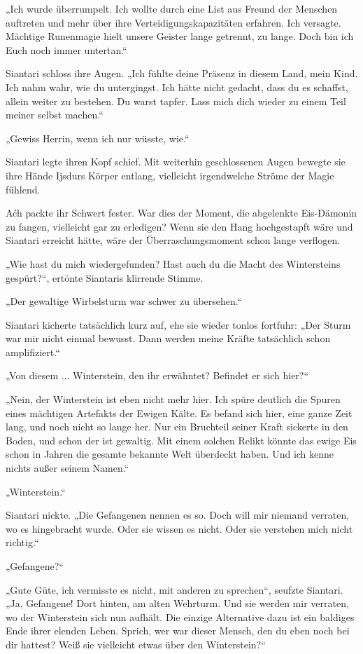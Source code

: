 „Ich wurde überrumpelt. Ich wollte durch eine List aus Freund der Menschen auftreten und mehr über ihre Verteidigungskapazitäten erfahren. Ich versagte. Mächtige Runenmagie hielt unsere Geister lange getrennt, zu lange. Doch bin ich Euch noch immer untertan.“

Siantari schloss ihre Augen. „Ich fühlte deine Präsenz in diesem Land, mein Kind. Ich nahm wahr, wie du untergingst. Ich hätte nicht gedacht, dass du es schaffst, allein weiter zu bestehen. Du warst tapfer. Lass mich dich wieder zu einem Teil meiner selbst machen.“

„Gewiss Herrin, wenn ich nur wüsste, wie.“

Siantari legte ihren Kopf schief. Mit weiterhin geschlossenen Augen bewegte sie ihre Hände Ijsdurs Körper entlang, vielleicht irgendwelche Ströme der Magie fühlend.

Aćh packte ihr Schwert fester. War dies der Moment, die abgelenkte Eis-Dämonin zu fangen, vielleicht gar zu erledigen? Wenn sie den Hang hochgestapft wäre und Siantari erreicht hätte, wäre der Überraschungsmoment schon lange verflogen.

„Wie hast du mich wiedergefunden? Hast auch du die Macht des Wintersteins gespürt?“, ertönte Siantaris klirrende Stimme.

„Der gewaltige Wirbelsturm war schwer zu übersehen.“

Siantari kicherte tatsächlich kurz auf, ehe sie wieder tonlos fortfuhr: „Der Sturm war mir nicht einmal bewusst. Dann werden meine Kräfte tatsächlich schon amplifiziert.“

„Von diesem ... Winterstein, den ihr erwähntet? Befindet er sich hier?“

„Nein, der Winterstein ist eben nicht mehr hier. Ich spüre deutlich die Spuren eines mächtigen Artefakts der Ewigen Kälte. Es befand sich hier, eine ganze Zeit lang, und noch nicht so lange her. Nur ein Bruchteil seiner Kraft sickerte in den Boden, und schon der ist gewaltig. Mit einem solchen Relikt könnte das ewige Eis schon in Jahren die gesamte bekannte Welt überdeckt haben. Und ich kenne nichts außer seinem Namen.“

„Winterstein.“

Siantari nickte. „Die Gefangenen nennen es so. Doch will mir niemand verraten, wo es hingebracht wurde. Oder sie wissen es nicht. Oder sie verstehen mich nicht richtig.“

„Gefangene?“

„Gute Güte, ich vermisste es nicht, mit anderen zu sprechen“, seufzte Siantari. „Ja, Gefangene! Dort hinten, am alten Wehrturm. Und sie werden mir verraten, wo der Winterstein sich nun aufhält. Die einzige Alternative dazu ist ein baldiges Ende ihrer elenden Leben. Sprich, wer war dieser Mensch, den du eben noch bei dir hattest? Weiß sie vielleicht etwas über den Winterstein?“

